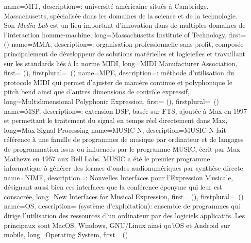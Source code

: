 {
    name={MIT},
    description={\textit{}: université américaine situés à Cambridge, Massachusetts, spécialisée dans les domaines de la science et de la technologie. Son \textit{Media Lab} est un lieu important d'innovation dans de multiples domaines de l'interaction homme-machine},
    long={Massachusetts Institute of Technology},
    first={ ()}
}
{
    name={MMA},
    description={\textit{}: organisation professionnelle sans profit, composée principalement de développeur de solutions matérielles et logicielles et travaillant sur les standards liés à la norme MIDI},
    long={MIDI Manufacturer Association},
    first={ ()},
    firstplural={\glspluralsuffix\ (\glspluralsuffix)}
}
{
    name={MPE},
    description={\textit{}: méthode d'utilisation du protocole MIDI qui permet d'ajuster de manière continue et polyphonique le pitch bend ainsi que d'autres dimensions de contrôle expressif},
    long={Multidimensional Polyphonic Expression},
   	first={ ()},
    firstplural={\glspluralsuffix\ (\glspluralsuffix)}
}
{
    name={MSP},
    description={\textit{}: extension \gls{DSP}, basée sur \gls{FTS}, ajoutée à Max en 1997 et permettant le traitement du signal en temps réel directement dans Max},
    long={Max Signal Processing}
}
{
    name={MUSIC-N},
    description={MUSIC-N fait référence à une famille de programmes de musique par ordinateur et de langages de programmation issus ou influencés par le programme MUSIC, écrit par Max Mathews en 1957 aux Bell Labs. MUSIC a été le premier programme informatique à générer des formes d'ondes audionumériques par synthèse directe}
}
{
    name={NIME},
    description={\textit{}: Nouvelles Interfaces pour l'Expression Musicale, désignant aussi bien ces interfaces que la conférence éponyme qui leur est consacrée},
    long={New Interfaces for Musical Expression},
    first={ ()},
    firstplural={\glspluralsuffix\ (\glspluralsuffix)}
}
{
    name={OS},
    description={\textit{} (système d'exploitation): ensemble de programmes qui dirige l'utilisation des ressources d'un ordinateur par des logiciels applicatifs. Les principaux sont MacOS, Windows, GNU/Linux ainsi qu'iOS et Android sur mobile},
    long={Operating System},
    first={ ()}
}
